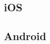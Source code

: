 
\cite{linkedin_mobile_deployment}

\subsection{iOS}
\cite{jenkins_ios_deployment}

\subsection{Android}
\cite{jenkins_android_deployment}